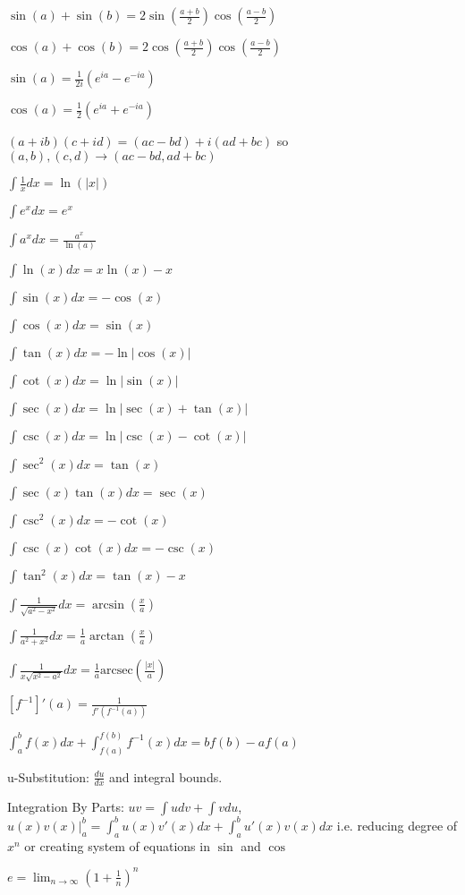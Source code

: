 $\sin(a)+\sin(b) = 2\sin \left(\frac{a+b}{2} \right) \cos \left(\frac{a-b}{2} \right)$

$\cos(a)+\cos(b) = 2\cos \left(\frac{a+b}{2} \right) \cos \left(\frac{a-b}{2} \right)$

$\sin(a) = \frac{1}{2i}(e^{ia}-e^{-ia})$

$\cos(a) = \frac{1}{2}(e^{ia}+e^{-ia})$

$(a+ib)(c+id)=(ac-bd)+i(ad+bc)$ so $(a,b),(c,d) \to (ac-bd,ad+bc)$

$\int \frac{1}{x} dx = \ln (|x|)$

$\int e^x dx = e^x$

$\int a^x dx = \frac{a^x}{\ln (a)}$

$\int \ln(x) dx = x\ln(x)-x$

$\int \sin(x) dx = - \cos(x)$

$\int \cos(x) dx = \sin(x)$

$\int \tan(x) dx = -\ln |\cos(x)|$

$\int \cot(x) dx = \ln |\sin(x)|$

$\int \sec(x) dx = \ln |\sec(x)+\tan(x)|$

$\int \csc(x) dx = \ln |\csc(x)-\cot(x)|$

$\int \sec^2(x) dx = \tan(x)$

$\int \sec(x)\tan(x) dx = \sec(x)$

$\int \csc^2(x) dx = -\cot(x)$

$\int \csc(x)\cot(x) dx = -\csc(x)$

$\int \tan^2(x) dx = \tan(x)-x$

$\int \frac{1}{\sqrt{a^2-x^2}} dx = \arcsin \left(\frac{x}{a} \right)$

$\int \frac{1}{a^2+x^2} dx = \frac{1}{a} \arctan \left(\frac{x}{a} \right)$

$\int \frac{1}{x\sqrt{x^2-a^2}} dx = \frac{1}{a} \text{arcsec} \left(\frac{|x|}{a} \right)$

$[f^{-1}]'(a) = \frac{1}{f'(f^{-1}(a))}$

$\int_a^b f(x)dx+\int_{f(a)}^{f(b)} f^{-1}(x)dx = bf(b)-af(a)$

u-Substitution: $\frac{du}{dx}$ and integral bounds.

Integration By Parts: $uv = \int u dv + \int v du$, $u(x)v(x) |_a^b = \int_a^b u(x)v'(x) dx + \int_a^b u'(x)v(x) dx$ i.e. reducing degree of $x^n$ or creating system of equations in $\sin$ and $\cos$

$e = \lim_{n \to \infty} \left(1+\frac{1}{n} \right)^n$

